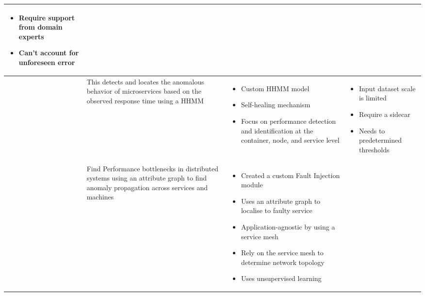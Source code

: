 \begin{longtable}{| p{20mm} | p{40mm} | p{43mm} | p{46mm} |}
\begin{itemize}[leftmargin=*,noitemsep,nolistsep]
    \item Require support from domain experts
    \item Can't account for unforeseen error
  \vspace{-7mm}
  \end{itemize} \\ \hline
  \cite{samir2019dla} &
  This detects and locates the anomalous behavior of microservices based on the observed response time using a HHMM &
  \vspace{-8mm}
  \begin{itemize}[leftmargin=*,noitemsep,nolistsep] 
    \item Custom HHMM model
    \item Self-healing mechanism
    \item Focus on performance detection and identification at the container, node, and service level
  \vspace{-7mm}
  \end{itemize} &
  \vspace{-8mm}
  \begin{itemize}[leftmargin=*,noitemsep,nolistsep] 
    \item Input dataset scale is limited
    \item Require a sidecar
    \item Needs to predetermined thresholds
  \vspace{-7mm}
  \end{itemize} \\ \hline
  \cite{wu2020microrca} &
  Find Performance bottlenecks in distributed systems using an attribute graph to find anomaly propagation across services and machines &
  \vspace{-8mm}
  \begin{itemize}[leftmargin=*,noitemsep,nolistsep] 
    \item Created a custom Fault Injection module
    \item Uses an attribute graph to localise to faulty service
    \item Application-agnostic by using a service mesh
    \item Rely on the service mesh to determine network topology
    \item Uses unsupervised learning
  \vspace{-7mm}
  \end{itemize} &
  \vspace{-8mm}
  \begin{itemize}[leftmargin=*,noitemsep,nolistsep] 

\end{itemize}
\end{longtable}
